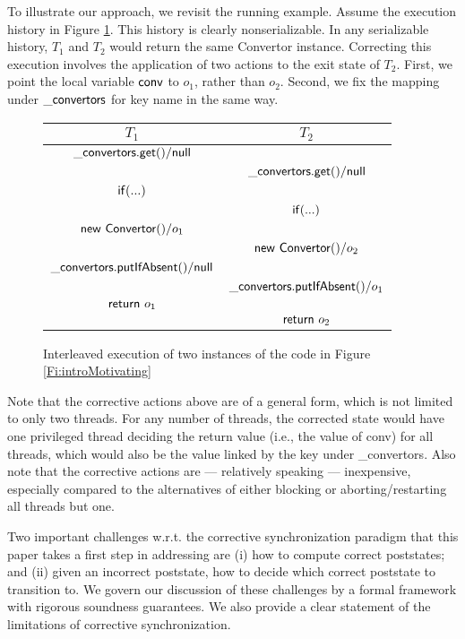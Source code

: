 To illustrate our approach, we revisit the running example. Assume the execution history in Figure \ref{Fi:motivatingInterleaving}.
This history is clearly nonserializable. In any serializable history, $T_1$ and $T_2$ would return the same {\sf Convertor} instance. Correcting this execution involves the application of two actions to the exit state of $T_2$. First, we point the local variable ${\sf conv}$ to $o_1$, rather than $o_2$. Second, we fix the mapping under ${\sf \_convertors}$ for key {\sf name} in the same way.

\begin{figure}
	\begin{center}
		\begin{tabular}{c||c}
			$T_1$ & $T_2$ \\
			\hline
			${\sf \_convertors.get()} / {\sf null}$ &  \\
			& ${\sf \_convertors.get()} / {\sf null}$ \\
			${\sf if (...)}$ 								   &							\\
			& ${\sf if (...)}$ \\
			${\sf new\ Convertor()} / o_1$		& \\
			& ${\sf new\ Convertor()} / o_2$ \\
			${\sf \_convertors.putIfAbsent()} / {\sf null}$ &  \\
			& 		${\sf \_convertors.putIfAbsent()} / o_1$ \\
			${\sf return}\ o_1$ & \\
			& ${\sf return}\ o_2$ \\
			\end{tabular}
			\end{center}
	\caption{\label{Fi:motivatingInterleaving}Interleaved execution of two instances of the code in Figure \ref{Fi:introMotivating}}
\end{figure}

Note that the corrective actions above are of a general form, which is not limited to only two threads. For any number of threads, the corrected state would have one privileged thread deciding the return value (i.e., the value of {\sf conv}) for all threads, which would also be the value linked by the key under {\sf \_convertors}. Also note that the corrective actions are --- relatively speaking --- inexpensive, especially compared to the alternatives of either blocking or aborting/restarting all threads but one.

Two important challenges w.r.t. the corrective synchronization paradigm that this paper takes a first step in addressing are (i) how to compute correct poststates; and (ii) given an incorrect poststate, how to decide which correct poststate to transition to. We govern our discussion of these challenges by a formal framework with rigorous soundness guarantees. We also provide a clear statement of the limitations of corrective synchronization.

